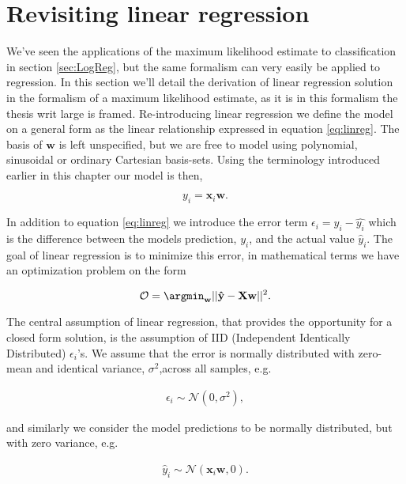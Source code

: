 \section{Revisiting linear regression}

We've seen the applications of the maximum likelihood estimate to classification in section \ref{sec:LogReg}, but the same formalism can very easily be applied to regression. In this section we'll detail the derivation of linear regression solution in the formalism of a maximum likelihood estimate, as it is in this formalism the thesis writ large is framed. Re-introducing linear regression we define the model on a general form as the linear relationship expressed in equation \ref{eq:linreg}. The basis of $\mathbf{w}$ is left unspecified, but we are free to model using polynomial, sinusoidal or ordinary Cartesian basis-sets. Using the terminology introduced earlier in this chapter our model is then, 

\begin{equation}\label{eq:linreg}
y_i = \mathbf{x}_i\mathbf{w}.
\end{equation}

\noindent In addition to equation \ref{eq:linreg} we introduce the error term $\epsilon_i= y_i - \hat{y_i}$ which is the difference between the models prediction, $y_i$, and the actual value $\hat{y}_i$. The goal of linear regression is to minimize this error, in mathematical terms we have an optimization problem on the form

\begin{equation}
\mathcal{O} = \argmin _{\mathbf{w}} || \mathbf{\hat{y}} - \mathbf{Xw} ||^2.
\end{equation}

\noindent The central assumption of linear regression, that provides the opportunity for a closed form solution, is the assumption of IID (Independent Identically Distributed) $\epsilon_i$'s. We assume that the error is normally distributed with zero-mean and identical variance, $\sigma^2$,across all samples, e.g. 

\begin{align}
\epsilon_i \sim \mathcal{N}(0, \sigma^2),
\end{align}

\noindent and similarly we consider the model predictions to be normally distributed, but with zero variance, e.g.

\begin{align}
\hat{y}_i \sim \mathcal{N}(\mathbf{x}_i\mathbf{w}, 0).
\end{align}

